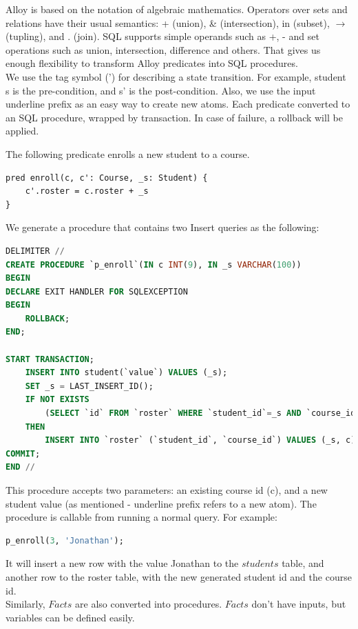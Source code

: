 \documentclass[oneside]{book}
\begin{document}
Alloy is based on the notation of algebraic mathematics. Operators over sets and relations have their usual semantics: + (union), \& (intersection), in (subset), $\rightarrow$ (tupling), and . (join). SQL supports simple operands such as +, - and set operations such as union, intersection, difference and others. That gives us enough flexibility to transform Alloy predicates into SQL procedures.\cite{sqlalgebra}\\

We use the tag symbol (') for describing a state transition. For example, student s is the pre-condition, and s' is the post-condition. Also, we use the input underline prefix as an easy way to create new atoms. Each predicate converted to an SQL procedure, wrapped by transaction. In case of failure, a rollback will be applied.

The following predicate enrolls a new student to a course. 
\begin{lstlisting}
pred enroll(c, c': Course, _s: Student) {
	c'.roster = c.roster + _s
}
\end{lstlisting}

We generate a procedure that contains two Insert queries as the following:
\begin{lstlisting}[escapechar=@,language=SQL]
DELIMITER //
CREATE PROCEDURE `p_enroll`(IN c INT(9), IN _s VARCHAR(100))
BEGIN
DECLARE EXIT HANDLER FOR SQLEXCEPTION
BEGIN
	ROLLBACK;
END;

START TRANSACTION;
	INSERT INTO student(`value`) VALUES (_s);
	SET _s = LAST_INSERT_ID();
	IF NOT EXISTS 
		(SELECT `id` FROM `roster` WHERE `student_id`=_s AND `course_id`=c) 
	THEN
		INSERT INTO `roster` (`student_id`, `course_id`) VALUES (_s, c);
COMMIT;
END //
\end{lstlisting}

This procedure accepts two parameters: an existing course id (c), and a new student value (as mentioned - underline prefix refers to a new atom). The procedure is callable from running a normal query. For example:

\begin{lstlisting}[escapechar=@,language=SQL]
p_enroll(3, 'Jonathan');
\end{lstlisting}

It will insert a new row with the value Jonathan to the $students$ table, and another row to the roster table, with the new generated student id and the course id.\\

Similarly, $Facts$ are also converted into procedures. $Facts$ don't have inputs, but variables can be defined easily.
\end{document}
